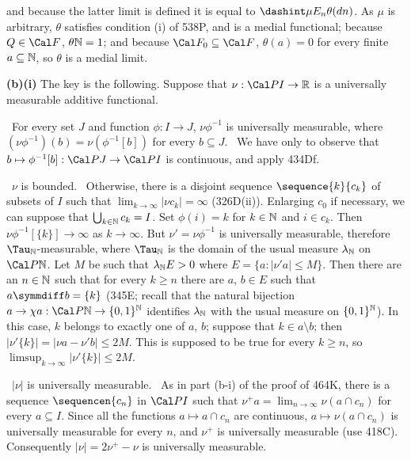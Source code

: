 {

\noindent and because the latter limit is defined it is equal to
$\dashint\mu E_n\theta(dn)$.   As $\mu$ is arbitrary, $\theta$ satisfies
condition (i) of 538P, and is a medial functional;  because $Q\in\Cal F$,
$\theta\Bbb N=1$;  and because $\Cal F_0\subseteq\Cal F$, $\theta(a)=0$ for
every finite $a\subseteq\Bbb N$, so $\theta$ is a medial limit.\ \Qed

\medskip

{\bf (b)(i)} The key is the following.   Suppose that
$\nu:\Cal PI\to\Bbb R$ is a universally measurable additive
functional.

\medskip

\qquad\grheada\ For every set $J$ and function
$\phi:I\to J$, $\nu\phi^{-1}$ is
universally measurable, where $(\nu\phi^{-1})(b)=\nu(\phi^{-1}[b])$ for
every $b\subseteq J$.   \Prf\ We have only to observe that
$b\mapsto\phi^{-1}[b]:\Cal PJ\to\Cal PI$ is continuous, and
apply 434Df.\ \Qed

\medskip

\qquad\grheadb\ $\nu$ is bounded.   \Prf\Quer\
Otherwise, there is a disjoint sequence
$\sequence{k}{c_k}$ of subsets of $I$ such that
$\lim_{k\to\infty}|\nu c_k|=\infty$ (326D(ii)).   Enlarging $c_0$ if
necessary, we can suppose that $\bigcup_{k\in\Bbb N}c_k=I$.
Set $\phi(i)=k$ for $k\in\Bbb N$ and $i\in c_k$.   Then
$\nu\phi^{-1}[\{k\}]\to\infty$ as $k\to\infty$.   But $\nu'=\nu\phi^{-1}$
is universally measurable, therefore
$\Tau_{\Bbb N}$-measurable, where $\Tau_{\Bbb N}$ is the
domain of the usual measure $\lambda_{\Bbb N}$ on $\Cal P\Bbb N$.
Let $M$ be such
that $\lambda_{\Bbb N}E>0$ where $E=\{a:|\nu'a|\le M\}$.   Then there are
an $n\in\Bbb N$ such that for every $k\ge n$ there are $a$, $b\in E$ such
that $a\symmdiff b=\{k\}$ (345E;  recall that the natural
bijection $a\to\chi a:\Cal P\Bbb N\to\{0,1\}^{\Bbb N}$ identifies
$\lambda_{\Bbb N}$ with the usual measure on $\{0,1\}^{\Bbb N}$).
In this case, $k$ belongs to
exactly one of $a$, $b$;  suppose that $k\in a\setminus b$;  then
$|\nu'\{k\}|=|\nu a-\nu'b|\le 2M$.   This is supposed to be true for
every $k\ge n$, so $\limsup_{k\to\infty}|\nu'\{k\}|\le 2M$.\ \Bang\Qed

\medskip

\qquad\grheadc\ $|\nu|$ is universally measurable.
\Prf\ As in part (b-i) of the proof of 464K, there is a sequence
$\sequencen{c_n}$ in $\Cal PI$ such that
$\nu^+a=\lim_{n\to\infty}\nu(a\cap c_n)$ for every $a\subseteq I$.
Since all the functions $a\mapsto a\cap c_n$ are continuous,
$a\mapsto\nu(a\cap c_n)$ is universally measurable for every $n$, and
$\nu^+$ is universally measurable (use 418C).
Consequently $|\nu|=2\nu^+-\nu$ is universally measurable.\ \Qed

}

